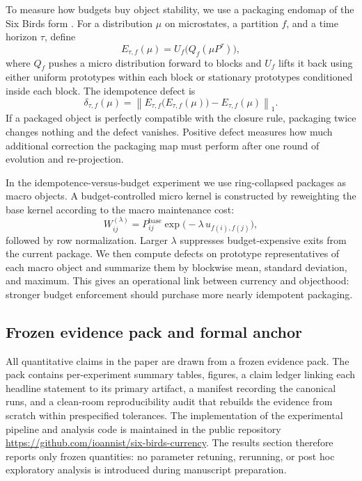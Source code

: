 To measure how budgets buy object stability, we use a packaging endomap of the Six Birds form \cite{tsiokos2026sixbirds}. For a distribution \(\mu\) on microstates, a partition \(f\), and a time horizon \(\tau\), define
\[
E_{\tau,f}(\mu)=U_f\big(Q_f(\mu P^\tau)\big),
\]
where \(Q_f\) pushes a micro distribution forward to blocks and \(U_f\) lifts it back using either uniform prototypes within each block or stationary prototypes conditioned inside each block. The idempotence defect is
\[
\delta_{\tau,f}(\mu)=\left\|E_{\tau,f}\!\big(E_{\tau,f}(\mu)\big)-E_{\tau,f}(\mu)\right\|_1.
\]
If a packaged object is perfectly compatible with the closure rule, packaging twice changes nothing and the defect vanishes. Positive defect measures how much additional correction the packaging map must perform after one round of evolution and re-projection.

In the idempotence-versus-budget experiment we use ring-collapsed packages as macro objects. A budget-controlled micro kernel is constructed by reweighting the base kernel according to the macro maintenance cost:
\[
W^{(\lambda)}_{ij}=P^{\mathrm{base}}_{ij}\exp\!\big(-\lambda\,u_{f(i),f(j)}\big),
\]
followed by row normalization. Larger \(\lambda\) suppresses budget-expensive exits from the current package. We then compute defects on prototype representatives of each macro object and summarize them by blockwise mean, standard deviation, and maximum. This gives an operational link between currency and objecthood: stronger budget enforcement should purchase more nearly idempotent packaging.

\subsection{Frozen evidence pack and formal anchor}

All quantitative claims in the paper are drawn from a frozen evidence pack. The pack contains per-experiment summary tables, figures, a claim ledger linking each headline statement to its primary artifact, a manifest recording the canonical runs, and a clean-room reproducibility audit that rebuilds the evidence from scratch within prespecified tolerances. The implementation of the experimental pipeline and analysis code is maintained in the public repository \url{https://github.com/ioannist/six-birds-currency}. The results section therefore reports only frozen quantities: no parameter retuning, rerunning, or post hoc exploratory analysis is introduced during manuscript preparation.

